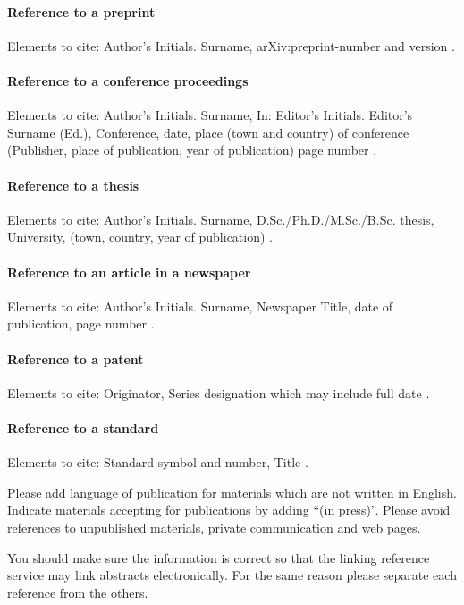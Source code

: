 \documentclass[USenglish,oneside,twocolumn]{article}
\begin{document}
\paragraph{Reference to a preprint}
Elements to cite:
Author's Initials. Surname,
arXiv:preprint-number and version \cite{arxiv-1,arxiv-2}.

\paragraph{Reference to a conference proceedings}
Elements to cite:
Author's Initials. Surname,
In: Editor's Initials. Editor's Surname (Ed.),
Conference,
date, place (town and country) of conference
(Publisher, place of publication, year of publication)
page number \cite{proceedings}.


\paragraph{Reference to a thesis}
Elements to cite:
Author's Initials. Surname,
D.Sc./Ph.D./M.Sc./B.Sc. thesis,
University,
(town, country, year of publication) \cite{thesis}.


\paragraph{Reference to an article in a newspaper}
Elements to cite:
Author's Initials. Surname,
Newspaper Title,
date of publication,
page number \cite{newspaper-1,newspaper-2}.


\paragraph{Reference to a patent}
Elements to cite:
Originator,
Series designation which may include full date \cite{patent}.


\paragraph{Reference to a standard}
Elements to cite:
Standard symbol and number,
Title \cite{standard-1,standard-2}.

Please add language of publication for materials which are not written in English. Indicate materials accepting for publications by adding ``(in press)''. Please avoid references to unpublished materials, private communication and web pages.

You should make sure the information is correct so that the linking reference service may link abstracts electronically. For the same reason please separate each reference from the others.
\end{document}
